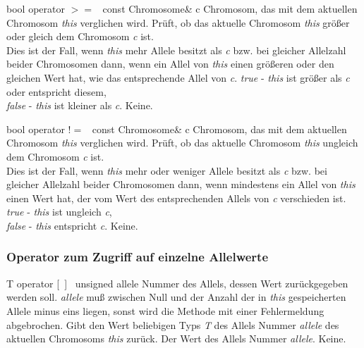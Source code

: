 \documentclass{report}
\begin{document}
    \setConstInstance
    \printMethodWithOneParam
        {bool}  
        {operator $>=$\ } 
        {const Chromosome\&}
        {c} 
        {Chromosom, das mit dem aktuellen Chromosom {\em this}
         verglichen wird.}
        {Pr\"uft, ob das aktuelle Chromosom {\em this}
         gr\"o{\ss}er oder gleich dem Chromosom {\em c} ist.\\
         Dies ist der Fall, wenn {\em this} mehr Allele
         besitzt als {\em c} bzw. bei gleicher Allelzahl beider Chromosomen
         dann, wenn ein Allel von {\em this} einen gr\"o{\ss}eren oder den 
         gleichen Wert hat, wie das entsprechende Allel von {\em c}.}
        {
         {\em true}\hspace{2pt} - {\em this} ist gr\"o{\ss}er als {\em c} 
                                  oder entspricht diesem,\\
         {\em false} - {\em this} ist kleiner als {\em c}.}
        {Keine.}

\newpage

    \setConstInstance
    \printMethodWithOneParam
        {bool}  
        {operator !$=$\ } 
        {const Chromosome\&}
        {c} 
        {Chromosom, das mit dem aktuellen Chromosom {\em this}
         verglichen wird.}
        {Pr\"uft, ob das aktuelle Chromosom {\em this}
         ungleich dem Chromosom {\em c} ist.\\
         Dies ist der Fall, wenn {\em this} mehr oder weniger Allele
         besitzt als {\em c} bzw. bei gleicher Allelzahl beider Chromosomen
         dann, wenn mindestens ein Allel von {\em this} einen Wert hat,
         der vom Wert des entsprechenden Allels von {\em c}
         verschieden ist.}
        {
         {\em true}\hspace{2pt} - {\em this} ist ungleich {\em c},\\
         {\em false} - {\em this} entspricht {\em c}.}
        {Keine.}

\subsubsection{Operator zum Zugriff auf einzelne Allelwerte}

    \setNormalInstance
    \printMethodWithOneParam
        {T}  
        {operator [\ ]\ } 
        {unsigned}
        {allele} 
        {Nummer des Allels, dessen Wert zur\"uckgegeben werden soll. 
         {\em allele} mu{\ss} zwischen Null und der Anzahl der in {\em this}
         gespeicherten Allele minus eins liegen, sonst wird die
         Methode mit einer Fehlermeldung abgebrochen.}
        {Gibt den Wert beliebigen Typs {\sl T} des Allels Nummer {\em allele}
         des aktuellen Chromosoms {\em this} zur\"uck.}
        {Der Wert des Allels Nummer {\em allele}.}
        {Keine.}
\end{document}
